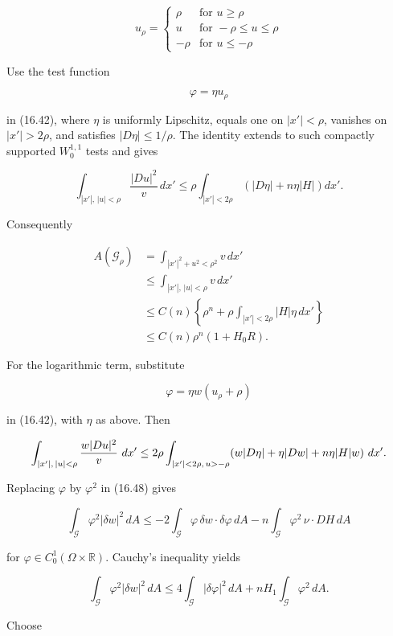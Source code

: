 \[
u_\rho =
\begin{cases}
\rho & \text{for } u \geq \rho \\
u & \text{for } -\rho \leq u \leq \rho \\
-\rho & \text{for } u \leq -\rho
\end{cases}
\]

Use the test function

\[
\varphi = \eta u_\rho
\]

in (16.42), where $\eta$ is uniformly Lipschitz, equals one on
$|x'|<\rho$, vanishes on $|x'|>2\rho$, and satisfies $|D\eta|\le1/\rho$.
The identity extends to such compactly supported $W_0^{1,1}$ tests and gives

\[
\int_{|x'|,\,|u|<\rho} \frac{|Du|^2}{v}\, dx' \leq \rho \int_{|x'|<2\rho} \left(|D\eta| + n\eta |H|\right) dx'.
\]

Consequently

\begin{align*}
A(\mathcal{G}_\rho) &= \int_{|x'|^2 + u^2 < \rho^2} v\, dx' \\
&\leq \int_{|x'|,\,|u|<\rho} v\, dx' \tag{16.53} \\
&\leq C(n)\left\{\rho^n + \rho \int_{|x'|<2\rho} |H|\eta\, dx'\right\} \\
&\leq C(n)\rho^n(1 + H_0 R).
\end{align*}

For the logarithmic term, substitute

\[
\varphi = \eta w(u_\rho + \rho)
\]







in (16.42), with $\eta$ as above. Then

\[
\int_{|x'|,\,|u|<\rho} \frac{w|Du|^2}{v}\,\,dx'
\le 2\rho \int_{|x'|<2\rho,\,u>-\rho} (w|D\eta|+\eta|Dw|+n\eta|H|w)\,\,dx'.
\]

Replacing $\varphi$ by $\varphi^2$ in (16.48) gives

\[
\int_{\mathcal{G}} \varphi^2|\delta w|^2\,dA
\le -2\int_{\mathcal{G}} \varphi\,\delta w\cdot\delta\varphi\,dA
- n\int_{\mathcal{G}} \varphi^2\,\nu\cdot DH\,dA
\]

for $\varphi\in C_0^1(\Omega\times\mathbb R)$. Cauchy's inequality yields

\[
\int_{\mathcal{G}} \varphi^2|\delta w|^2\,dA
\le 4\int_{\mathcal{G}} |\delta\varphi|^2\,dA + nH_1 \int_{\mathcal{G}} \varphi^2\,dA.
\]

Choose

